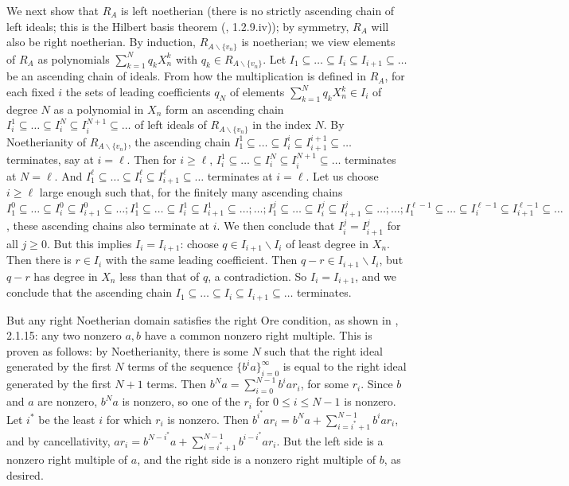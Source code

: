 \documentclass{amsart}
\theoremstyle{definition}
\theoremstyle{remark}
\numberwithin{equation}{section}
\begin{document}
We next show that $R_{A}$ is left noetherian (there is no strictly ascending chain of left ideals; this is the Hilbert basis theorem (\cite{mcconnell1987noncommutative}, 1.2.9.iv)); by symmetry, $R_{A}$ will also be right noetherian. By induction, $R_{A \backslash \{v_{n}\}}$ is noetherian; we view elements of $R_{A}$ as polynomials $\sum^{N}_{k=1} q_{k}X^{k}_{n}$ with $q_{k} \in R_{A \backslash \{v_{n}\}}$. Let $I_{1} \subseteq \ldots \subseteq I_{i} \subseteq I_{i+1} \subseteq \ldots$ be an ascending chain of ideals. From how the multiplication is defined in $R_{A}$, for each fixed $i$ the sets of leading coefficients $q_{N}$ of elements $\sum^{N}_{k=1} q_{k}X^{k}_{n} \in I_{i}$ of degree $N$ as a polynomial in $X_{n}$ form an ascending chain $I^{1}_{i} \subseteq \ldots \subseteq I^{N}_{i} \subseteq I^{N+1}_{i} \subseteq \ldots$ of left ideals of $R_{A \backslash \{v_{n}\}}$ in the index $N$. By Noetherianity of $R_{A \backslash \{v_{n}\}}$, the ascending chain $I^{1}_{1} \subseteq \ldots \subseteq I^{i}_{i} \subseteq I^{i+1}_{i+1} \subseteq \ldots$ terminates, say at $i = \ell$. Then for $i \geq \ell$, $I^{1}_{i} \subseteq \ldots \subseteq I^{N}_{i} \subseteq I^{N+1}_{i} \subseteq \ldots$ terminates at $N = \ell$. And $I^{\ell}_{1} \subseteq \ldots \subseteq I^{\ell}_{i} \subseteq I^{\ell}_{i+1} \subseteq \ldots$ terminates at $i = \ell$. Let us choose $i \geq \ell$ large enough such that, for the finitely many ascending chains $I^{0}_{1} \subseteq \ldots \subseteq I^{0}_{i} \subseteq I^{0}_{i+1} \subseteq \ldots; I^{1}_{1} \subseteq \ldots \subseteq I^{1}_{i} \subseteq I^{1}_{i+1} \subseteq \ldots; \ldots ; I^{j}_{1} \subseteq \ldots \subseteq I^{j}_{i} \subseteq I^{j}_{i+1} \subseteq \ldots ; \ldots ; I^{\ell-1}_{1} \subseteq \ldots \subseteq I^{\ell-1}_{i} \subseteq I^{\ell-1}_{i+1} \subseteq \ldots$, these ascending chains also terminate at $i$. We then conclude that $I^{j}_{i}= I^{j}_{i+1}$ for all $j \geq 0$. But this implies $I_{i}=I_{i+1}$: choose $q \in I_{i+1} \backslash I_{i}$ of least degree in $X_{n}$. Then there is $r \in I_{i}$ with the same leading coefficient. Then $q - r \in I_{i+1} \backslash I_{i}$, but $q-r$ has degree in $X_{n}$ less than that of $q$, a contradiction. So $I_{i}=I_{i+1}$, and we conclude that the ascending chain $I_{1} \subseteq \ldots \subseteq I_{i} \subseteq I_{i+1} \subseteq \ldots$ terminates.


But any right Noetherian domain satisfies the right Ore condition, as shown in \cite{mcconnell1987noncommutative}, 2.1.15: any two nonzero $a, b$ have a common nonzero right multiple. This is proven as follows: by Noetherianity, there is some $N$ such that the right ideal generated by the first $N$ terms of the sequence $\{b^{i}a\}^{\infty}_{i=0}$ is equal to the right ideal generated by the first $N+1$ terms. Then $b^{N}a= \sum^{N-1}_{i =0} b^{i}ar_{i}$, for some $r_{i}$. Since $b$ and $a$ are nonzero, $b^{N}a$ is nonzero, so one of the $r_{i}$ for $0 \leq i \leq N-1$ is nonzero. Let $i^{*}$ be the least $i$ for which $r_{i}$ is nonzero. Then $b^{i^{*}}a r_{i} = b^{N}a + \sum^{N-1}_{i =i^{*}+1} b^{i}ar_{i}$, and by cancellativity, $a r_{i} = b^{N-i^{*}}a + \sum^{N-1}_{i =i^{*}+1} b^{i-i^{*}}ar_{i}$. But the left side is a nonzero right multiple of $a$, and the right side is a nonzero right multiple of $b$, as desired.
\end{document}

